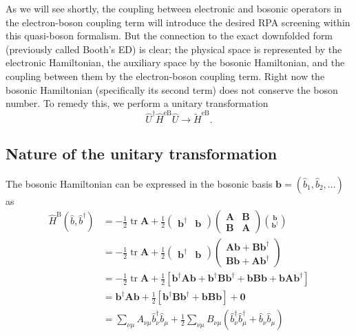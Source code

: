 As we will see shortly, the coupling between electronic and bosonic operators in the electron-boson coupling term will introduce the desired RPA screening within this quasi-boson formalism. But the connection to the exact downfolded form (previously called Booth's ED) is clear; the physical space is represented by the electronic Hamiltonian, the auxiliary space by the bosonic Hamiltonian, and the coupling between them by the electron-boson coupling term. Right now the bosonic Hamiltonian (specifically its second term) does not conserve the boson number. To remedy this, we perform a unitary transformation
\begin{equation}
\hat{U}^{\dagger} \hat{H}^{\mathrm{eB}} \hat{U} \rightarrow \tilde{H}^{\mathrm{eB}}.
\end{equation}
\subsection{Nature of the unitary transformation}
The bosonic Hamiltonian can be expressed in the bosonic basis $\bm{{b}} = \left( \hat{b}_1, \hat{b}_2, \ldots \right)$ as
\begin{align}
\hat{H}^{\mathrm{B}}\left(\hat{b}, \hat{b}^{\dagger}\right)&=-\frac{1}{2} \operatorname{tr} \mathbf{A}+\frac{1}{2}\left(\begin{array}{ll}
\mathbf{b}^{\dagger} & \mathbf{b}
\end{array}\right)\left(\begin{array}{ll}
\mathbf{A} & \mathbf{B} \\
\mathbf{B} & \mathbf{A}
\end{array}\right)\binom{\mathbf{b}}{\mathbf{b}^{\dagger}}
\label{eq:rpa_rec}
 \\
&=-\frac{1}{2} \operatorname{tr} \mathbf{A}+\frac{1}{2}\begin{pmatrix}\bm{b}^{\dagger}& \bm{b}\end{pmatrix}\begin{pmatrix}
    \bm{A}\bm{b} + \bm{B}\bm{b}^{\dagger} \\
    \bm{B}\bm{b} + \bm{A}\bm{b}^{\dagger}
\end{pmatrix} \\
&=-\frac{1}{2} \operatorname{tr} \mathbf{A}+\frac{1}{2}\left[\bm{b}^{\dagger} \bm{A} \bm{b} + \bm{b}^{\dagger} \bm{B} \bm{b}^{\dagger} + \bm{b} \bm{B} \bm{b} + \bm{b} \bm{A} \bm{b}^{\dagger}\right]
\label{eq:normal}
 \\
&=\bm{b}^{\dagger} \bm{A} \bm{b} + \frac{1}{2}\left[\bm{b}^{\dagger} \bm{B} \bm{b}^{\dagger} + \bm{b} \bm{B} \bm{b}\right] + \bm{0}\\
&=\sum_{\nu \mu} A_{\nu \mu} \hat{b}_\nu^{\dagger} \hat{b}_\mu+\frac{1}{2} \sum_{\nu \mu} B_{\nu \mu}\left(\hat{b}_\nu^{\dagger} \hat{b}_\mu^{\dagger}+\hat{b}_\nu \hat{b}_\mu\right)
\end{align}
